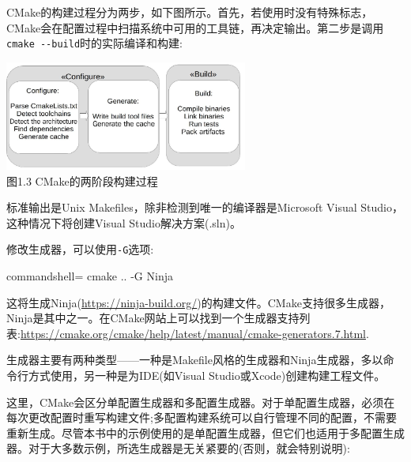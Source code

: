 
CMake的构建过程分为两步，如下图所示。首先，若使用时没有特殊标志，CMake会在配置过程中扫描系统中可用的工具链，再决定输出。第二步是调用\texttt{cmake -{}-build}时的实际编译和构建:

\begin{center}
\includegraphics[width=0.6\textwidth]{content/1/chapter1/images/3.jpg}\\
图1.3  CMake的两阶段构建过程
\end{center}

标准输出是Unix Makefiles，除非检测到唯一的编译器是Microsoft Visual Studio，这种情况下将创建Visual Studio解决方案(.sln)。

修改生成器，可以使用\texttt{-G}选项:

\begin{tcblisting}{commandshell={}}
cmake .. -G Ninja
\end{tcblisting}

这将生成Ninja(\url{https://ninja-build.org/})的构建文件。CMake支持很多生成器，Ninja是其中之一。在CMake网站上可以找到一个生成器支持列表:\url{https://cmake.org/cmake/help/latest/manual/cmake-generators.7.html}.

生成器主要有两种类型——一种是Makefile风格的生成器和Ninja生成器，多以命令行方式使用，另一种是为IDE(如Visual Studio或Xcode)创建构建工程文件。

这里，CMake会区分单配置生成器和多配置生成器。对于单配置生成器，必须在每次更改配置时重写构建文件;多配置构建系统可以自行管理不同的配置，不需要重新生成。尽管本书中的示例使用的是单配置生成器，但它们也适用于多配置生成器。对于大多数示例，所选生成器是无关紧要的(否则，就会特别说明):

